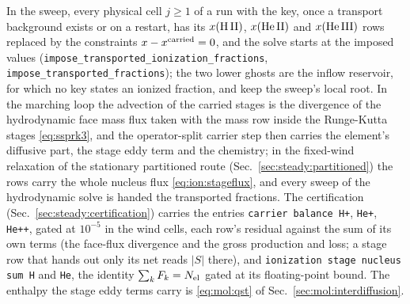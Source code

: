 In the sweep, every physical cell $j\ge1$ of a run with the key, once a
transport background exists or on a restart, has its $x({\rm H\,II})$,
$x({\rm He\,II})$ and $x({\rm He\,III})$ rows replaced by the constraints
$x - x^{\rm carried} = 0$, and the solve starts at the imposed values
(\texttt{impose\_transported\_ionization\_fractions},
\texttt{impose\_transported\_fractions}); the two lower ghosts are the inflow
reservoir, for which no key states an ionized fraction, and keep the sweep's
local root. In the marching loop the advection of the carried stages is the
divergence of the hydrodynamic face mass flux taken with the mass row inside
the Runge-Kutta stages \eqref{eq:ssprk3}, and the operator-split carrier step
then carries the element's diffusive part, the stage eddy term and the
chemistry; in the fixed-wind relaxation of the stationary partitioned route
(Sec.~\ref{sec:steady:partitioned}) the rows carry the whole nucleus flux
\eqref{eq:ion:stageflux}, and every sweep of the hydrodynamic solve is handed
the transported fractions. The certification
(Sec.~\ref{sec:steady:certification}) carries the entries \texttt{carrier
balance H+}, \texttt{He+}, \texttt{He++}, gated at $10^{-5}$ in the wind
cells, each row's residual against the sum of its own terms (the face-flux
divergence and the gross production and loss; a stage row that hands out only
its net reads $|S|$ there), and \texttt{ionization stage nucleus sum H} and
\texttt{He}, the identity $\sum_kF_k = N_{\rm el}$ gated at its floating-point
bound. The enthalpy the stage eddy terms carry is
\eqref{eq:mol:qst} of Sec.~\ref{sec:mol:interdiffusion}.

